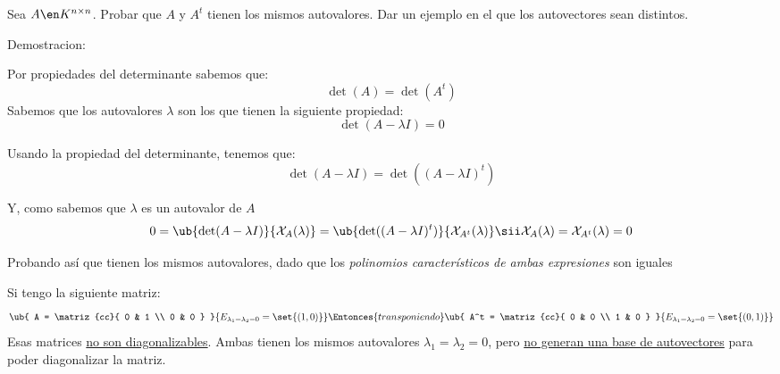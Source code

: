 \begin{enunciado}{\ejercicio}
  Sea $A \en K^{n \times n}$. Probar que $A$ y $A^t$ tienen los mismos autovalores. Dar un ejemplo en el
  que los autovectores sean distintos.
\end{enunciado}

Demostracion:

Por propiedades del determinante sabemos que:
$$
  \det(A) = \det(A^t)
$$
Sabemos que los autovalores $\lambda$ son los que tienen la siguiente propiedad:
$$
  \det(A - \lambda I) = 0
$$

Usando la propiedad del determinante, tenemos que:
$$
  \det(A - \lambda I) = \det((A - \lambda I)^t)
$$

Y, como sabemos que $\lambda$ es un autovalor de $A$
$$
  0 =
  \ub{
    \det(A - \lambda I)
  }{\mathcal{X}_A(\lambda)} =
  \ub{
    \det((A - \lambda I)^t)
  }{\mathcal{X}_{A^t}(\lambda)}
  \sii
  \mathcal{X}_A(\lambda) = \mathcal{X}_{A^t}(\lambda) = 0
$$

Probando así que tienen los mismos autovalores, dado que los \textit{polinomios característicos de ambas expresiones} son iguales

Si tengo la siguiente matriz:
$$
  \ub{
    A =
    \matriz{cc}{
      0 & 1 \\
      0 & 0
    }
  }{
    E_{\lambda_1 = \lambda_2 = 0} = \set{(1,0)}
  }
  \Entonces{transponiendo}
  \ub{
    A^t =
    \matriz{cc}{
      0 & 0 \\
      1 & 0
    }
  }{
    E_{\lambda_1 = \lambda_2 = 0} = \set{(0,1)}
  }
$$
Esas matrices \underline{no son diagonalizables}. Ambas tienen los mismos autovalores $\lambda_1 = \lambda_2 = 0$,
pero \ul{no generan una base de autovectores} para poder diagonalizar la matriz.

\begin{aportes}
  \item {}
  \item {}
\end{aportes}
